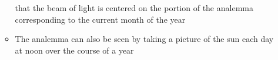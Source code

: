 \documentclass[final]{beamer}
\begin{document}
\begin{frame}
\begin{columns}[t]
\begin{column}[t]{0.24 \textwidth}
\begin{itemize}
\begin{itemize}
that the beam of light is centered on the portion of the 
analemma corresponding to the current month of the year
\begin{center}
\end{center}
\item The analemma can also be seen by taking a picture
of the sun each day at noon over the course of a year
\begin{center}
\end{center}
\end{itemize}
\end{itemize}
\end{column}    


\end{columns}
\end{frame}
\end{document}
